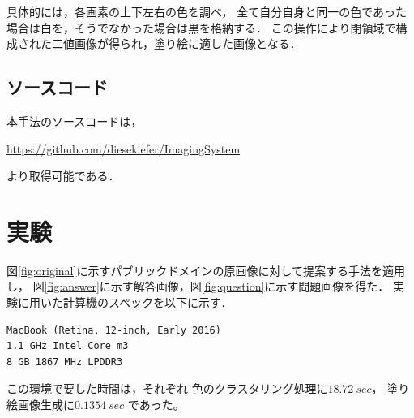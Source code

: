 \documentclass[dvipdfmx]{jsarticle}
\begin{document}
具体的には，各画素の上下左右の色を調べ，
全て自分自身と同一の色であった場合は白を，そうでなかった場合は黒を格納する．
この操作により閉領域で構成された二値画像が得られ，塗り絵に適した画像となる．




\subsection{ソースコード}

本手法のソースコードは，

\noindent\url{https://github.com/diesekiefer/ImagingSystem}

\noindent より取得可能である．


\section{実験}
図\ref{fig:original}に示すパブリックドメインの原画像に対して提案する手法を適用し，
図\ref{fig:answer}に示す解答画像，図\ref{fig:question}に示す問題画像を得た．
実験に用いた計算機のスペックを以下に示す．
\begin{verbatim}
MacBook (Retina, 12-inch, Early 2016)
1.1 GHz Intel Core m3
8 GB 1867 MHz LPDDR3
\end{verbatim}
この環境で要した時間は，それぞれ
色のクラスタリング処理に$\SI{18.72}{sec}$，
塗り絵画像生成に$\SI{0.1354}{sec}$
であった。
\end{document}
